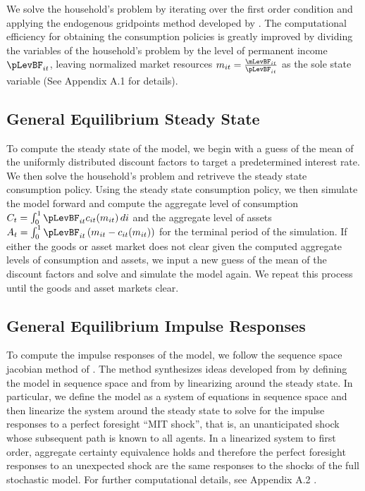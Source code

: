 \documentclass[titlepage]{\econtex}\providecommand{\texname}{FBS-NK}
\begin{document}
We solve the household's problem by iterating over the first order condition and applying the endogenous gridpoints method developed by \cite{carroll2006method}. The computational efficiency for obtaining the consumption policies is greatly improved by dividing the variables of the household's problem by the level of permanent income $\pLevBF_{it}$, leaving normalized market resources $m_{it} = \frac{ \mLevBF_{it}}{\pLevBF_{it}}$ as the sole state variable (See Appendix  A.1 for details).  

\hypertarget{General Equilibrium Steady State}{}
\subsection{General Equilibrium Steady State}

To compute the steady state of the model, we begin with a guess of the mean of the uniformly distributed discount factors to target a predetermined interest rate. We then solve the household's problem and retriveve the steady state consumption policy. Using the steady state consumption policy, we then simulate the model forward and compute the aggregate level of consumption $ C_{t} =  \int_{0}^{1} \pLevBF_{it} c_{it}(m_{it})\, di$  and the aggregate level of assets $ A_{t} = \int_{0}^{1} \pLevBF_{it} \left( m_{it} -  c_{it}(m_{it}) \right)$ for the terminal period of the simulation. If either the goods or asset market does not clear given the computed aggregate levels of consumption and assets,  we input a new guess of the mean of the discount factors and solve and simulate the model again. We repeat this process until the goods and asset markets clear.  


\hypertarget{General Equilibrium Impulse Responses}{}
\subsection{General Equilibrium Impulse Responses}

To compute the impulse responses of the model, we follow the sequence space jacobian method of \cite{auclert2019using} . The method synthesizes ideas developed from  \cite {boppart2018exploiting} by defining the model in sequence space and from \cite{reiter2009solving} by linearizing around the steady state. In particular, we define the model as a system of equations in sequence space and then linearize the system around the steady state to solve for the impulse responses to a perfect foresight ``MIT shock'', that is, an unanticipated shock whose subsequent path is known to all agents.  In a linearized system to first order, aggregate certainty equivalence holds  \cite{ simon1956dynamic}  \cite{theil1957note}  and therefore the perfect foresight responses to an unexpected shock are the same responses to the shocks of the full stochastic model. For further computational details, see Appendix A.2 . \\ 
\end{document}
